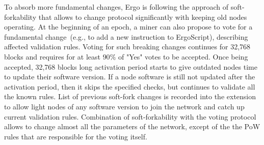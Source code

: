 To absorb more fundamental changes, Ergo is following the approach of soft-forkability that
allows to change protocol significantly with keeping old nodes operating.
At the beginning of an epoch, a miner can also propose to vote for a fundamental change~(e.g., to add a new instruction to ErgoScript), describing affected validation rules.
Voting for such breaking changes continues for 32,768 blocks and requires for at least $90\%$ of
"Yes" votes to be accepted.
Once being accepted, 32,768 blocks long activation period starts to give outdated
nodes time to update their software version.
If a node software is still not updated after the activation period, then it skips the specified checks, but continues
to validate all the known rules.
List of previous soft-fork changes is recorded into the extension to allow light nodes of
any software version to join the network and catch up current validation rules.
Combination of soft-forkability with the voting protocol allows to change almost all the parameters of the network,
except of the the PoW rules that are responsible for the voting itself.
